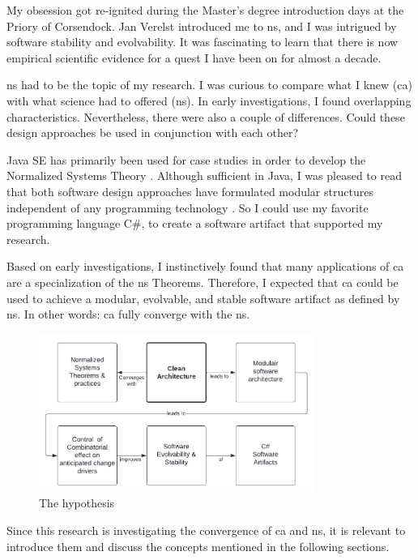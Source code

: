 My obsession got re-ignited during the Master's degree introduction days at the Priory of
Corsendock. Jan Verelst introduced me to \gls{ns}, and I was intrigued by software
stability and evolvability. It was fascinating to learn that there is now empirical
scientific evidence for a quest I have been on for almost a decade. 

\gls{ns} had to be the topic of my research. I was curious to compare what I knew
(\gls{ca}) with what science had to offered (\gls{ns}). In early investigations, I found
overlapping characteristics. Nevertheless, there were also a couple of differences. Could
these design approaches be used in conjunction with each other?

Java SE has primarily been used for case studies in order to develop the Normalized
Systems Theory \parencite{oorts_building_2014, de_bruyn_enabling_2018}. Although
sufficient in Java, I was pleased to read that both software design approaches have
formulated modular structures independent of any programming technology
\parencite{mannaert_normalized_2009,robert_c_martin_clean_2018}. So I could use my
favorite programming language C\#, to create a software artifact that supported my
research. 

Based on early investigations, I instinctively found that many applications of \gls{ca}
are a specialization of the \gls{ns} Theorems. Therefore, I expected that \gls{ca} could
be used to achieve a modular, evolvable, and stable software artifact as defined by
\gls{ns}. In other words: \gls{ca} fully converge with the \gls{ns}.

\begin{figure}[H]
    \centering
    \includegraphics[width=0.8\textwidth]{figures/hypothesis.pdf}
    \caption[My hypothesis]{The hypothesis}
    \label{fig_hypothesis}
\end{figure}

Since this research is investigating the convergence of \gls{ca} and \gls{ns}, it is
relevant to introduce them and discuss the concepts mentioned in the following sections.



